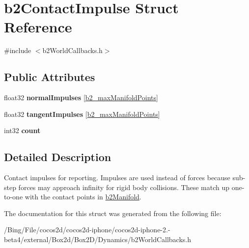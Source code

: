 \hypertarget{structb2_contact_impulse}{\section{b2\-Contact\-Impulse Struct Reference}
\label{structb2_contact_impulse}
}


{\ttfamily \#include $<$b2\-World\-Callbacks.\-h$>$}

\subsection*{Public Attributes}
\begin{DoxyCompactItemize}
\item 
\hypertarget{structb2_contact_impulse_a553d3562a3a34ea013e2d9860f6fd207}{float32 {\bfseries normal\-Impulses} \mbox{[}\hyperlink{b2_settings_8h_aa5f44cc9edf711433dea2b2ec94f3c42}{b2\-\_\-max\-Manifold\-Points}\mbox{]}}\label{structb2_contact_impulse_a553d3562a3a34ea013e2d9860f6fd207}

\item 
\hypertarget{structb2_contact_impulse_aebd9875b1f55a90865770a53e30e609a}{float32 {\bfseries tangent\-Impulses} \mbox{[}\hyperlink{b2_settings_8h_aa5f44cc9edf711433dea2b2ec94f3c42}{b2\-\_\-max\-Manifold\-Points}\mbox{]}}\label{structb2_contact_impulse_aebd9875b1f55a90865770a53e30e609a}

\item 
\hypertarget{structb2_contact_impulse_a258e094ab0d769971f40d6c144420bf7}{int32 {\bfseries count}}\label{structb2_contact_impulse_a258e094ab0d769971f40d6c144420bf7}

\end{DoxyCompactItemize}


\subsection{Detailed Description}
Contact impulses for reporting. Impulses are used instead of forces because sub-\/step forces may approach infinity for rigid body collisions. These match up one-\/to-\/one with the contact points in \hyperlink{structb2_manifold}{b2\-Manifold}. 

The documentation for this struct was generated from the following file\-:\begin{DoxyCompactItemize}
\item 
/\-Bing/\-File/cocos2d/cocos2d-\/iphone/cocos2d-\/iphone-\/2.-\/beta4/external/\-Box2d/\-Box2\-D/\-Dynamics/b2\-World\-Callbacks.\-h\end{DoxyCompactItemize}
